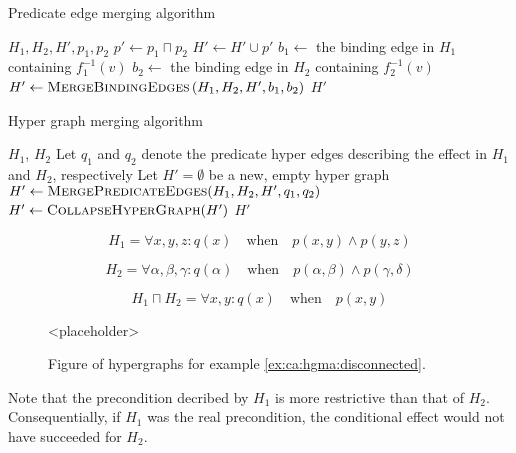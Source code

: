 \documentclass[../Master.tex]{subfiles}
\begin{document}
\begin{algorithm}
    \caption{Predicate edge merging algorithm}
    \label{algo:prededgemerge}

    \begin{algorithmic}
         {$H_1, H_2, H', p_1, p_2$}
            \State $p' \gets p_1 \sqcap p_2$
            \State $H' \gets H' \cup p'$
                    \State $b_1 \gets$ the binding edge in $H_1$ containing $f_1^{-1}(v)$
                    \State $b_2 \gets$ the binding edge in $H_2$ containing $f_2^{-1}(v)$
                    \State $H' \gets \textsc{MergeBindingEdges}
                        \left( H_1, H_2, H', b_1, b_2 \right)$
                \EndIf
            \EndFor
            \State \Return $H'$
        \EndFunction
    \end{algorithmic}
\end{algorithm}

\begin{algorithm}
    \caption{Hyper graph merging algorithm}
    \label{algo:hypergraphmerge}
    \begin{algorithmic}
         {$H_1$, $H_2$}
            \State Let $q_1$ and $q_2$ denote the predicate hyper edges describing the effect in $H_1$ and $H_2$, respectively
            \State Let $H' = \emptyset$ be a new, empty hyper graph
            \State $H' \gets \textsc{MergePredicateEdges}(H_1,H_2,H',q_1,q_2)$
            \State $H' \gets \textsc{CollapseHyperGraph}(H')$
            \State \Return $H'$
        \EndFunction
    \end{algorithmic}
\end{algorithm}

\begin{example} \label{ex:ca:hgma:disconnected}
    \begin{equation*}
        H_1 = \forall x, y, z : q(x) \quad \text{when} \quad
            p(x,y) \land p(y, z)
    \end{equation*}

    \begin{equation*}
        H_2 = \forall \alpha, \beta, \gamma : q(\alpha) \quad \text{when} \quad
            p(\alpha, \beta) \land p(\gamma, \delta)
    \end{equation*}

    \begin{equation*}
        H_1 \sqcap H_2 = \forall x, y : q(x) \quad \text{when} \quad p(x, y)
    \end{equation*}

    \begin{figure}
        <placeholder>
        \caption{\label{fig:ex:ca:hgma:ex:disconnected} Figure of hypergraphs for example \ref{ex:ca:hgma:disconnected}.}
    \end{figure}

    Note that the precondition decribed by $H_1$ is more restrictive than that of $H_2$. Consequentially, if $H_1$ was the real precondition, the conditional effect would not have succeeded for $H_2$.
\end{example}
\end{document}
